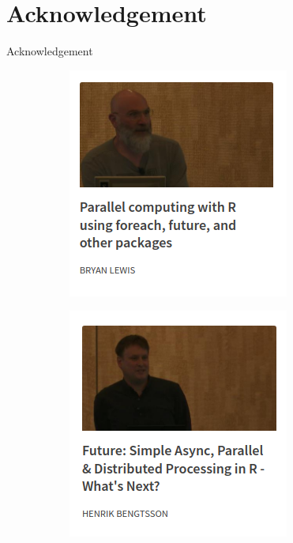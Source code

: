 \documentclass[aspectratio=169,xcolor={dvipsnames,table}]{beamer}
\begin{document}
\section{Acknowledgement}
{
  \begin{frame}{Acknowledgement}
    \begin{figure}[htbp]
      \centering
      \begin{subfigure}[h]{0.4\textwidth}
        \includegraphics[width = \textwidth]{foreach_talk}
      \end{subfigure}
      \begin{subfigure}[h]{0.4\textwidth}
        \includegraphics[width = \textwidth]{future_talk}

\end{subfigure}
\end{figure}
\end{frame}}
\end{document}
